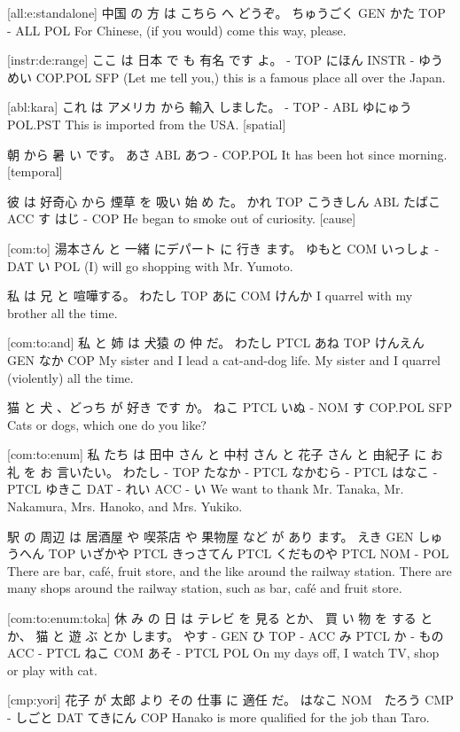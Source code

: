 [all:e:standalone]
中国      の  方    は こちら へ どうぞ。
ちゅうごく GEN かた TOP -    ALL POL
For Chinese, (if you would) come this way, please.

[instr:de:range]
ここ は  日本    で   も  有名    です   よ。
-   TOP にほん INSTR - ゆうめい COP.POL SFP
(Let me tell you,) this is a famous place all over the Japan.

[abl:kara]
これ は アメリカ から 輸入 しました。
-  TOP -      ABL ゆにゅう POL.PST
This is imported from the USA. [spatial]

朝  から  暑 い   です。
あさ ABL あつ - COP.POL
It has been hot since morning. [temporal]

彼   は  好奇心    から 煙草   を  吸い 始 め た。
かれ TOP こうきしん ABL たばこ ACC す  はじ - COP
He began to smoke out of curiosity. [cause]

[com:to]
湯本さん と  一緒 にデパート に 行き ます。
ゆもと  COM いっしょ -    DAT い  POL
(I) will go shopping with Mr. Yumoto.

私     は  兄  と  喧嘩する。
わたし TOP あに COM けんか
I quarrel with my brother all the time.

[com:to:and]
私     と   姉   は   犬猿   の  仲   だ。
わたし PTCL あね TOP けんえん GEN なか COP
My sister and I lead a cat-and-dog life.
My sister and I quarrel (violently) all the time.

猫    と  犬 、どっち が 好き です    か。
ねこ PTCL いぬ -     NOM す COP.POL SFP
Cats or dogs, which one do you like?

[com:to:enum]
私 たち  は  田中 さん と   中村 さん  と    花子 さん と  由紀子 に  お 礼   を お 言いたい。
わたし - TOP たなか - PTCL なかむら - PTCL はなこ - PTCL ゆきこ DAT - れい ACC - い
We want to thank Mr. Tanaka, Mr. Nakamura, Mrs. Hanoko, and Mrs. Yukiko.

駅   の  周辺       は 居酒屋    や    喫茶店   や     果物屋  など  が  あり ます。
えき GEN しゅうへん TOP いざかや PTCL きっさてん PTCL くだものや PTCL NOM -   POL
There are bar, café, fruit store, and the like around the railway station.
There are many shops around the railway station, such as bar, café and fruit store.

[com:to:enum:toka]
休  み の  日  は テレビ を 見る とか、 買 い 物  を する とか、 猫  と  遊  ぶ とか します。
やす - GEN ひ TOP -   ACC み  PTCL  か - もの ACC -  PTCL ねこ COM あそ - PTCL POL
On my days off, I watch TV, shop or play with cat.

[cmp:yori]
花子   が   太郎 より その 仕事  に  適任    だ。
はなこ NOM　たろう CMP - しごと DAT てきにん COP
Hanako is more qualified for the job than Taro.

